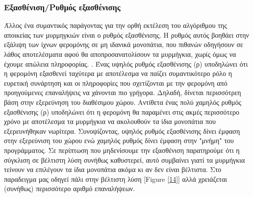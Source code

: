 \subsubsection{Εξασθένιση/Ρυθμός εξασθένισης}
Άλλος ένα συμαντικός παράγοντας για την ορθή εκτέλεση του αλγόριθμου της αποικείας των μυρμηγκιών είναι ο ρυθμός εξασθένισης. Η ρυθμός αυτός βοηθάει στην εξάλιψη των ίχνων φερομόνης σε μη ιδανικά μονοπάτια, που πιθανών οδηγήσουν σε λάθος αποτελέσματα αφού θα αποπροσανατολίσουν τα μυρμήγκια, χωρίς όμως να έχουμε απώλεια πληροφορίας. \cite{Mavrovouniotis}. Ένας υψηλός ρυθμός εξασθένισης (ρ) υποδηλώνει ότι η φερομόνη εξασθενεί ταχύτερα με αποτέλεσμα να παίζει συμαντικότερο ρόλο η ευρετική συνάρτηση και οι πληροφορίες που σχετίζονται με την φερομόνη από προηγούμενες επαναλήψεις να χάνονται πιο γρήγορα. Δηλαδή, δίνεται περισσότρεη βάση στην εξερεύνηση του διαθέσιμου χώρου. Αντίθετα ένας πολύ χαμηλός ρυθμός εξασθένισης (ρ) υποδηλώνει ότι η φερομόνη θα παραμένει στις ακμές περισσότερο χρόνο με αποτέλεσμα τα μυρμήγκια να ακολουθούν τα ίδια μονοπάτια που εξερευνήθηκαν νωρίτερα.
Συνοψίζοντας, υψηλός ρυθμός εξασθένισης δίνει έμφαση στην εξερεύνιση του χώρου ενώ χαμηλός ρυθμός δίνει έμφαση στην "μνήμη" του προγράμματος. Σε περίπτωση που μηδενίσουμε την εξασθένιση παρατηρούμε ότι η σύγκλιση σε βέλτιστη λύση συνήθως καθυστερεί, αυτό συμβαίνει γιατί τα μυρμήγκια τείνουν να επιλέγουν τα ίδια μονοπάτια ακόμα κι αν δεν είναι βέλτιστα. Στο παραδειγμα μας οδηγεί πάλι στην βέλτιστη λύση [Figure \ref{14}] αλλά χρειάζεται (συνήθως) περισσότερο αριθμό επαναλήψεων.



